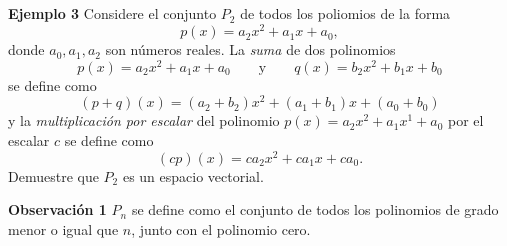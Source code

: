 
\subsection{}

{\nologo
\begin{frame}%

\vspace{-2.5mm}
\begin{ej}{\textbf{Ejemplo 3}}\justifying
	Considere el conjunto $P_2$ de todos los poliomios de la forma 
	\[
		p(x) = a_2x^2 + a_1x + a_0,
	\]
	donde $a_0,a_1,a_2$ son números reales. La \textit{suma} de dos polinomios 
	\[
		p(x) = a_2x^2 + a_1x + a_0 \qquad \text{y} \qquad q(x) = b_2x^2 + b_1x + b_0
	\]
	se define como
	\[
		(p + q)(x) = (a_2+b_2)x^2 + (a_1+b_1)x + (a_0+b_0)
	\]
	y la \textit{multiplicación por escalar} del polinomio $p(x) = a_2x^2 + a_1x^1 + a_0$ por el escalar $c$ se define como
	\[
		(cp)(x) = ca_2x^2 + ca_1x + ca_0.
	\]
	Demuestre que $P_2$ es un espacio vectorial.
\end{ej}

\vspace{-2mm}
\begin{alertblock}{\textbf{Observación 1}}
	$P_n$ se define como el conjunto de todos los polinomios de grado menor o igual que $n$, junto con el 
	polinomio cero.
\end{alertblock}

\end{frame}
}


\subsection{}

